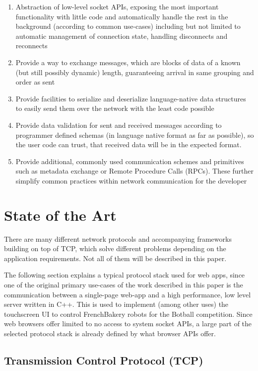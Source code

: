 \documentclass[conference]{IEEEtran}
\begin{document}
\begin{enumerate}
    \item Abstraction of low-level socket APIs, exposing the most important functionality with little code and automatically handle the rest in the background (according to common use-cases) including but not limited to automatic management of connection state, handling disconnects and reconnects
    \item Provide a way to exchange messages, which are blocks of data of a known (but still possibly dynamic) length, guaranteeing arrival in same grouping and order as sent
    \item Provide facilities to serialize and deserialize language-native data structures to easily send them over the network with the least code possible
    \item Provide data validation for sent and received messages according to programmer defined schemas (in language native format as far as possible), so the user code can trust, that received data will be in the expected format.
    \item Provide additional, commonly used communication schemes and primitives such as metadata exchange or Remote Procedure Calls (RPCs). These further simplify common practices within network communication for the developer
\end{enumerate}


\section{State of the Art}

There are many different network protocols and accompanying frameworks building on top of TCP, which solve different problems depending on the application requirements. Not all of them will be described in this paper.

The following section explains a typical protocol stack used for web apps, since one of the original primary use-cases of the work described in this paper is the communication between a single-page web-app and a high performance, low level server written in C++. This is used to implement (among other uses) the touchscreen UI to control FrenchBakery robots for the Botball competition. Since web browsers offer limited to no access to system socket APIs, a large part of the selected protocol stack is already defined by what browser APIs offer.


\subsection{Transmission Control Protocol (TCP)}
\end{document}
